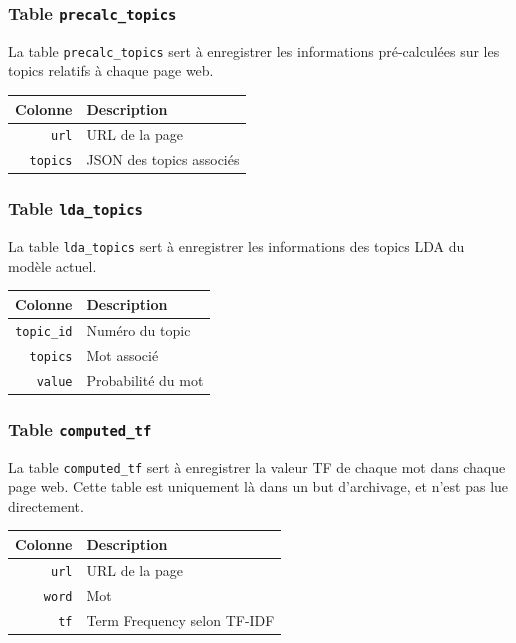 		\subsubsection{Table \texttt{precalc\_topics}}\label{table-precalc-topics}
			La table \texttt{precalc\_topics} sert à enregistrer les informations pré-calculées sur les topics relatifs à chaque page web.

			\begin{tabular}{rl}
				\textbf{Colonne} & \textbf{Description} \\
				\hline
				\texttt{url} & URL de la page \\
			    \texttt{topics} & JSON des topics associés \\
			\end{tabular}
		
		\subsubsection{Table \texttt{lda\_topics}}\label{table-lda-topics}
			La table \texttt{lda\_topics} sert à enregistrer les informations des topics LDA du modèle actuel.

			\begin{tabular}{rl}
				\textbf{Colonne} & \textbf{Description} \\
				\hline
				\texttt{topic\_id} & Numéro du topic \\
			    \texttt{topics} & Mot associé \\
			    \texttt{value} & Probabilité du mot \\
			\end{tabular}
		
		\subsubsection{Table \texttt{computed\_tf}}\label{table-computed-tf}
			La table \texttt{computed\_tf} sert à enregistrer la valeur TF de chaque mot dans chaque page web. Cette table est uniquement là dans un but d'archivage, et n'est pas lue directement.

			\begin{tabular}{rl}
				\textbf{Colonne} & \textbf{Description} \\
				\hline
				\texttt{url} & URL de la page \\
			    \texttt{word} & Mot \\
			    \texttt{tf} & Term Frequency selon TF-IDF \\
			\end{tabular}
		
